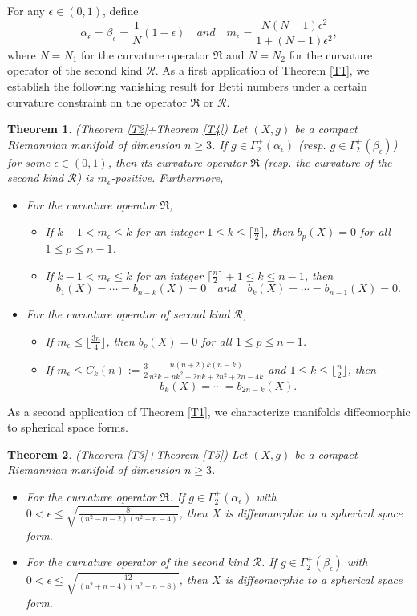 \documentclass[12pt, twoside]{article}
\newtheorem{theorem}{Theorem}[section]
\theoremstyle{definition}
\numberwithin{equation}{section}
\def \a {\alpha }
\begin{document}
For any $\epsilon\in(0,1)$, define 
\begin{equation}
\alpha_\epsilon=\beta_\epsilon=\frac{1}{N}(1-\epsilon) \quad and\quad
m_{\epsilon}= \frac{N(N-1)\epsilon^2}{1+(N-1)\epsilon^2},
\end{equation}
where $N=N_{1}$ for the curvature operator $\mathfrak{R}$ and $N=N_{2}$ for the curvature operator of the second kind $\mathcal{R}$. As a first application of Theorem \ref{T1}, we establish the following vanishing result for Betti numbers under a certain curvature constraint  on the operator  $\mathfrak{R}$ or $\mathcal{R}$.
\begin{theorem}(Theorem \ref{T2}+Theorem \ref{T4})
Let $(X,g)$ be a compact Riemannian manifold of dimension $n\geq 3$. If $g\in\Gamma^{+}_{2}(\a_{\epsilon})$ (resp. $g\in\Gamma^{+}_{2}(\beta_{\epsilon})$) for some $\epsilon\in(0,1)$, then its curvature operator $\mathfrak{R}$ (resp. the curvature of the second kind $\mathcal{R}$) is $m_{\epsilon}$-positive. Furthermore, 
\begin{itemize}
\item[(1)] For the curvature operator $\mathfrak{R}$,
\begin{itemize}
\item If $k-1< m_{\epsilon}\leq k$ for an integer $1\leq k\leq \lceil\frac{n}{2}\rceil$, then $b_{p}(X)=0$ for all $1\leq p\leq n-1$.
\item If  $k-1<m_{\epsilon}\leq k$ for an integer $ \lceil\frac{n}{2}\rceil+1\leq k\leq n-1$, then 
$$ b_{1}(X)=\cdots=b_{n-k}(X)=0\quad and\quad b_{k}(X)=\cdots=b_{n-1}(X)=0.$$
\end{itemize}
\item[(2)] For the curvature operator of second kind $\mathcal{R}$,
\begin{itemize}
\item If  $m_{\epsilon}\leq\lfloor\frac{3n}{4}\rfloor$, then $b_{p}(X)=0$ for all $1\leq p\leq n-1$.
\item If $m_{\epsilon}\leq C_{k}(n):=\frac{3}{2}\frac{n(n+2)k(n-k)}{n^{2}k-nk^{2}-2nk+2n^{2}+2n-4k}$ and $1\leq k\leq\lfloor\frac{n}{2}\rfloor$, then 
$$b_{k}(X)=\cdots=b_{2n-k}(X).$$
\end{itemize}
\end{itemize}
\end{theorem}
As a second application of Theorem \ref{T1}, we characterize manifolds diffeomorphic to spherical space forms.
\begin{theorem}(Theorem \ref{T3}+Theorem \ref{T5})
Let $(X,g)$ be a compact Riemannian manifold of dimension $n\geq 3$.
\begin{itemize}
\item[(1)] For the curvature operator $\mathfrak{R}$. If $g\in \Gamma^{+}_2(\alpha_\epsilon)$ with
$0<\epsilon\leq\sqrt{\frac{8}{(n^{2}-n-2)(n^{2}-n-4)}}$, then $X$ is diffeomorphic to a spherical space form.
\item[(2)] For the curvature operator of the second kind $\mathcal{R}$. If $g \in \Gamma^{+}_2(\beta_\epsilon)$ with $0<\epsilon\leq\sqrt{\frac{12}{(n^{2}+n-4)(n^{2}+n-8)}}$, then $X$ is diffeomorphic to a spherical space form.
\end{itemize}
\end{theorem}
\end{document}
